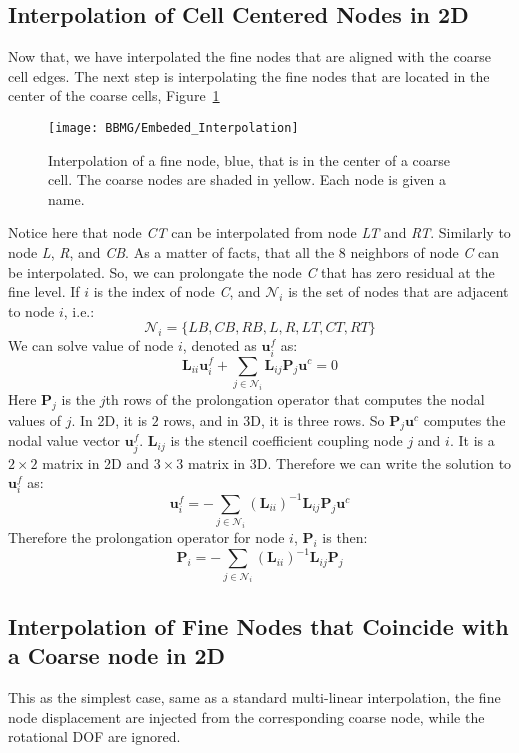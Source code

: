 \subsection{Interpolation of Cell Centered Nodes in 2D}
Now that, we have interpolated the fine nodes that are aligned with the coarse cell edges. The next step is interpolating the fine nodes that are located in the center of the coarse cells, Figure~\ref{fig:embedded_interpolation}
\begin{figure}[t]
\texttt{[image: BBMG/Embeded\_Interpolation]}
\centering
\caption{Interpolation of a fine node, blue, that is in the center of a coarse cell. The coarse nodes are shaded in yellow. Each node is given a name.}
\label{fig:embedded_interpolation}
\end{figure}
Notice here that node \textit{CT} can be interpolated from node \textit{LT} and \textit{RT}. Similarly to node \textit{L},  \textit{R}, and \textit{CB}. As a matter of facts, that all the 8 neighbors of node \textit{C} can be interpolated. So, we can prolongate the node \textit{C} that has zero residual at the fine level. If $i$ is the index of node \textit{C}, and $\mathcal{N}_i$ is the set of nodes that are adjacent to node $i$, i.e.:
$$
\mathcal{N}_i = \{\textit{LB},\textit{CB},\textit{RB},\textit{L},\textit{R},\textit{LT},\textit{CT},\textit{RT}\}
$$
We can solve value of node $i$, denoted as $\mathbf{u}^f_i$ as:
\begin{equation}
\mathbf{L}_{ii}\mathbf{u}^f_i + \sum_{j \in \mathcal{N}_i}\mathbf{L}_{ij}\mathbf{P}_j\mathbf{u}^c = 0 
\end{equation}
Here $\mathbf{P}_j$ is the $j$th rows of the prolongation operator that computes the nodal values of $j$. In 2D, it is $2$ rows, and in 3D, it is three rows. So $\mathbf{P}_j\mathbf{u}^c$ computes the nodal value vector $\mathbf{u}^f_j$. $\mathbf{L}_{ij}$ is the stencil coefficient coupling node $j$ and $i$. It is a $2 \times 2$ matrix in 2D and $3 \times 3$ matrix in 3D. Therefore we can write the solution to $\mathbf{u}^f_i$ as:
\begin{equation}
\mathbf{u}^f_i = -\sum_{j \in \mathcal{N}_i}(\mathbf{L}_{ii})^{-1}\mathbf{L}_{ij}\mathbf{P}_j\mathbf{u}^c
\end{equation}
Therefore the prolongation operator for node $i$, $\mathbf{P}_i$ is then:
\begin{equation}
\mathbf{P}_i = -\sum_{j \in \mathcal{N}_i}(\mathbf{L}_{ii})^{-1}\mathbf{L}_{ij}\mathbf{P}_j
\end{equation}
\subsection{Interpolation of Fine Nodes that Coincide with a Coarse node in 2D}
This as the simplest case, same as a standard multi-linear interpolation, the fine node displacement are injected from the corresponding coarse node, while the rotational DOF are ignored.
